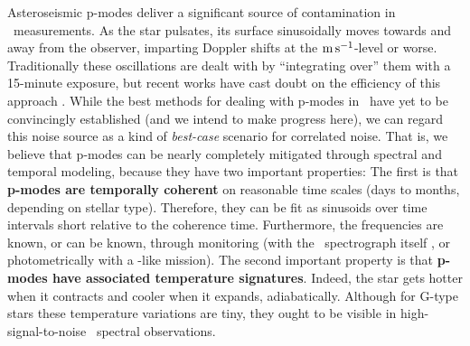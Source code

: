 \documentclass[12pt, letterpaper]{article}
\begin{document}
Asteroseismic p-modes deliver a significant source of contamination in \EPRV\
measurements. 
As the star pulsates, its surface sinusoidally moves towards and away from
the observer, imparting Doppler shifts at the ${\mathrm{m\,s^{-1}}}$-level or worse.
Traditionally these oscillations are dealt with by ``integrating over'' them
with a 15-minute exposure, but recent works have cast doubt on the efficiency 
of this approach \citep{Medina2018, Chaplin2019}. 
While the best methods for dealing with p-modes in \EPRV\ have yet 
to be convincingly established (and we intend to make progress here),
we can regard this noise source as a kind of
\textit{best-case} scenario for correlated noise. That is, we believe that 
p-modes can be nearly completely mitigated through spectral and temporal modeling, 
because they have two important properties:
The first is that
\textbf{p-modes are temporally coherent} on reasonable time scales (days to months, depending on
stellar type). Therefore, they can be fit as sinusoids over time intervals 
short relative to the coherence time. Furthermore, the frequencies are known,
or can be known, through monitoring (with the \EPRV\ spectrograph itself 
\citep[][and references therein]{Bouchy2003},
or photometrically with a \TESS-like mission).
The second important property is that
\textbf{p-modes have associated temperature signatures}. Indeed, the star gets
hotter when it contracts and cooler when it expands, adiabatically. Although for
G-type stars these temperature variations are tiny, they ought to be visible in
high-signal-to-noise \EPRV\ spectral observations.
\end{document}
